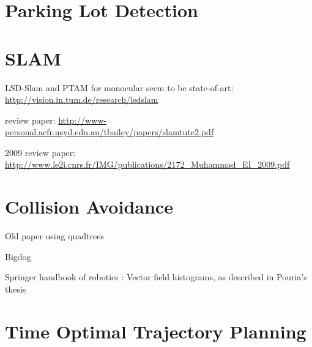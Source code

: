 \section{Parking Lot Detection}
% 
% 
% 
% 
% 
% 
% 
% 
% 

\section{SLAM}

LSD-Slam and PTAM for monocular seem to be state-of-art: \url{http://vision.in.tum.de/research/lsdslam}

review paper: \url{http://www-personal.acfr.usyd.edu.au/tbailey/papers/slamtute2.pdf}

2009 review paper: \url{http://www.le2i.cnrs.fr/IMG/publications/2172_Muhammad_EI_2009.pdf}

\section{Collision Avoidance}
Old paper using quadtrees\cite{ghoshray1996comprehensive}

Bigdog \cite{raibert2008bigdog}

Springer handbook of robotics \cite{siciliano2008springer}: Vector field histograms, as described in Pouria's thesis \cite{talebifard2014risk}


\section{Time Optimal Trajectory Planning}
\cite{fiorini1996time}

